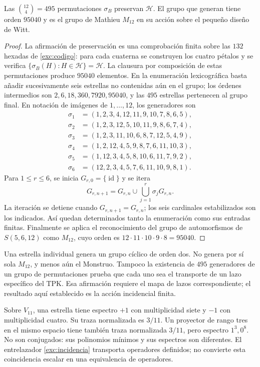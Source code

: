 \begin{proposition}
\label{exc:m12}
Las $\binom{12}4=495$ permutaciones $\sigma_B$ preservan $\mathcal H$.
El grupo que generan tiene orden $95040$ y es el grupo de Mathieu
$M_{12}$ en su acción sobre el pequeño diseño de Witt.
\end{proposition}

\begin{proof}
La afirmación de preservación es una comprobación finita sobre las
$132$ hexadas de \eqref{exc:codigo}: para cada cuaterna se construyen
los cuatro pétalos y se verifica
$\{\sigma_B(H):H\in\mathcal H\}=\mathcal H$.
La clausura por composición de estas permutaciones produce $95040$
elementos. En la enumeración lexicográfica basta añadir sucesivamente
seis estrellas no contenidas aún en el grupo; los órdenes intermedios
son $2,6,18,360,7920,95040$, y las $495$ estrellas pertenecen al grupo
final. En notación de imágenes de \(1,\ldots,12\), los generadores son
\[
\begin{aligned}
 \sigma_1&=(1,2,3,4,12,11,9,10,7,8,6,5),\\
 \sigma_2&=(1,2,3,12,5,10,11,9,8,6,7,4),\\
 \sigma_3&=(1,2,3,11,10,6,8,7,12,5,4,9),\\
 \sigma_4&=(1,2,12,4,5,9,8,7,6,11,10,3),\\
 \sigma_5&=(1,12,3,4,5,8,10,6,11,7,9,2),\\
 \sigma_6&=(12,2,3,4,5,7,6,11,10,9,8,1).
\end{aligned}
\]
Para \(1\leq r\leq6\), se inicia \(G_{r,0}=\{\operatorname{id}\}\) y se itera
\[
 G_{r,n+1}=G_{r,n}\cup\bigcup_{j=1}^{r}\sigma_jG_{r,n}.
\]
La iteración se detiene cuando \(G_{r,n+1}=G_{r,n}\); los seis
cardinales estabilizados son los indicados. Así quedan determinados
tanto la enumeración como sus entradas finitas. Finalmente se aplica el reconocimiento
del grupo de automorfismos de $S(5,6,12)$ como $M_{12}$, cuyo orden es
$12\cdot11\cdot10\cdot9\cdot8=95040$.
\end{proof}

Una estrella individual genera un grupo cíclico de orden dos. No
genera por sí sola $M_{12}$, y menos aún el Monstruo. Tampoco la
existencia de $495$ generadores de un grupo de permutaciones prueba que
cada uno sea el transporte de un lazo específico del TPK. Esa afirmación
requiere el mapa de lazos correspondiente; el resultado aquí establecido
es la acción incidencial finita.

\begin{remark}
Sobre $V_{11}$, una estrella tiene espectro $+1$ con multiplicidad siete
y $-1$ con multiplicidad cuatro. Su traza normalizada es $3/11$.
Un proyector de rango tres en el mismo espacio tiene también traza
normalizada $3/11$, pero espectro $1^3,0^8$. No son conjugados: sus
polinomios mínimos y sus espectros son diferentes. El entrelazador
\eqref{exc:incidencia} transporta operadores definidos; no convierte
esta coincidencia escalar en una equivalencia de operadores.
\end{remark}

